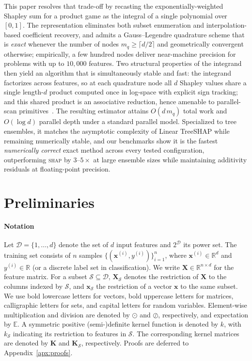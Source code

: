 \documentclass{article}
\newcommand{\cD}{\mathcal{D}}
\newcommand{\cS}{\mathcal{S}}
\newcommand{\E}{\mathbb{E}}
\newcommand{\X}{\mathbf{X}}
\newcommand{\x}{\mathbf{x}}
\newcommand{\K}{\mathbf{K}}
\begin{document}
This paper resolves that trade-off by recasting the exponentially-weighted Shapley sum for a product game as the integral of a single polynomial over $[0,1]$. The representation eliminates both subset enumeration and interpolation-based coefficient recovery, and admits a Gauss--Legendre quadrature scheme that is \emph{exact} whenever the number of nodes $m_q \geq \lceil d/2 \rceil$ and geometrically convergent otherwise; empirically, a few hundred nodes deliver near-machine precision for problems with up to $10{,}000$ features. Two structural properties of the integrand then yield an algorithm that is simultaneously stable and fast: the integrand factorizes across features, so at each quadrature node all $d$ Shapley values share a single length-$d$ product computed once in log-space with explicit sign tracking; and this shared product is an associative reduction, hence amenable to parallel-scan primitives~\citep{blelloch1990prefix}. The resulting estimator attains $O(d\,m_q)$ total work and $O(\log d)$ parallel depth under a standard parallel model. Specialized to tree ensembles, it matches the asymptotic complexity of Linear TreeSHAP while remaining numerically stable, and our benchmarks show it is the fastest \emph{numerically correct} exact method across every tested configuration, outperforming \textsc{shap} by $3$--$5{\times}$ at large ensemble sizes while maintaining additivity residuals at floating-point precision.


\section{Preliminaries}
\label{sec:preliminaries}

\paragraph{Notation}
Let $\cD = \{1,\dots,d\}$ denote the set of $d$ input features and $2^\cD$ its power set.
The training set consists of $n$ samples $\{(\x^{(i)}, y^{(i)})\}_{i=1}^n$, where
$\x^{(i)} \in \mathbb{R}^d$ and $y^{(i)} \in \mathbb{R}$ (or a discrete label set in classification).
We write $\X \in \mathbb{R}^{n \times d}$ for the feature matrix.
For a subset $\cS \subseteq \cD$, $\X_{\cS}$ denotes the restriction of $\X$ to the columns indexed by $\cS$,
and $\x_{\cS}$ the restriction of a vector $\x$ to the same subset.
We use bold lowercase letters for vectors, bold uppercase letters for matrices, calligraphic letters for sets, and capital letters for random variables.
Element-wise multiplication and division are denoted by $\odot$ and $\oslash$, respectively, and expectation by $\E$.
A symmetric positive (semi-)definite kernel function is denoted by $k$, with $k_{\cS}$ indicating its restriction to features in $\cS$.
The corresponding kernel matrices are denoted by $\K$ and $\K_{\cS}$, respectively. Proofs are deferred to Appendix~\ref{apx:proofs}.
\end{document}
